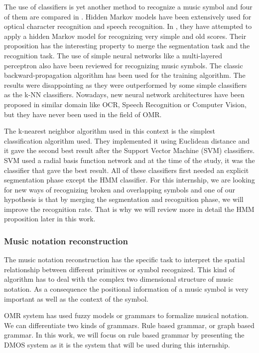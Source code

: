 \documentclass[11pt]{sdm}
\begin{document}
The use of classifiers is yet another method to recognize a music symbol and four of them are compared in \cite{rebelo_optical_2009}.
Hidden Markov models have been extensively used for optical character recognition and speech recognition.
In \cite{pugin_optical_2006}, they have attempted to apply a hidden Markov model for recognizing very simple and old scores.
Their proposition has the interesting property to merge the segmentation task and the recognition task.
The use of simple neural networks like a multi-layered perceptron also have been reviewed for recognizing music symbols.
The classic backward-propagation algorithm has been used for the training algorithm.
The results were disappointing as they were outperformed by some simple classifiers as the k-NN classifiers.
Nowadays, new neural network architectures have been proposed in similar domain like OCR, Speech Recognition or Computer Vision, but they have never been used in the field of OMR.

The k-nearest neighbor algorithm used in this context is the simplest classification algorithm used.
They implemented it using Euclidean distance and it gave the second best result after the Support Vector Machine (SVM) classifiers.
SVM used a radial basis function network and at the time of the study, it was the classifier that gave the best result.
All of these classifiers first needed an explicit segmentation phase except the HMM classifier.
For this internship, we are looking for new ways of recognizing broken and overlapping symbols and one of our hypothesis is that by merging the segmentation and recognition phase, we will improve the recognition rate.
That is why we will review more in detail the HMM proposition later in this work.

\subsubsection{Music notation reconstruction}

The music notation reconstruction has the specific task to interpret the spatial relationship between different primitives or symbol recognized.
This kind of algorithm has to deal with the complex two dimensional structure of music notation.
As a consequence the positional information of a music symbol is very important as well as the context of the symbol.

OMR system has used fuzzy models or grammars to formalize musical notation.
We can differentiate two kinds of grammars.
Rule based grammar, or graph based grammar.
In this work, we will focus on rule based grammar by presenting the DMOS system \cite{couasnon_dmos_2001} as it is the system that will be used during this internship.
\end{document}
